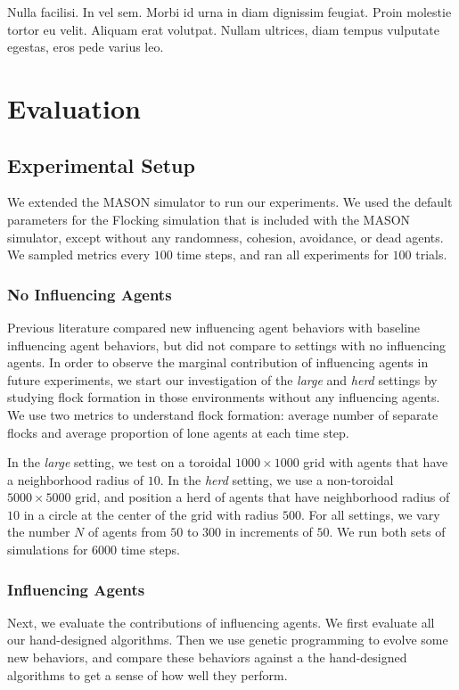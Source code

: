 \begin{savequote}[75mm]
Nulla facilisi. In vel sem. Morbi id urna in diam dignissim feugiat. Proin molestie tortor eu velit. Aliquam erat volutpat. Nullam ultrices, diam tempus vulputate egestas, eros pede varius leo.
\end{savequote}

\chapter{Evaluation}
\label{ch:evaluation}

\section{Experimental Setup}

We extended the MASON simulator to run our experiments\cite{luke05mason}.
We used the default parameters for the Flocking simulation that is included
with the MASON simulator, except without any randomness, cohesion, avoidance,
or dead agents.
We sampled metrics every $100$ time steps, and ran all experiments for $100$
trials.

\subsection{No Influencing Agents}
Previous literature compared new influencing agent behaviors with baseline
influencing agent behaviors, but did not compare to settings with no
influencing agents.
In order to observe the marginal contribution of influencing agents
in future experiments, we start our investigation of the \textit{large} and
\textit{herd} settings by studying flock formation in those environments
without any influencing agents.
We use two metrics to understand flock formation: average number of separate
flocks and average proportion of lone agents at each time step.

In the \textit{large} setting, we test on a toroidal $1000\times1000$ grid with
agents that have a neighborhood radius of $10$.
In the \textit{herd} setting, we use a non-toroidal $5000\times5000$ grid, and
position a herd of agents that have neighborhood radius of $10$ in a circle at
the center of the grid with radius $500$.
For all settings, we vary the number $N$ of agents from $50$ to $300$ in
increments of $50$.
We run both sets of simulations for $6000$ time steps.

\subsection{Influencing Agents}
Next, we evaluate the contributions of influencing agents.
We first evaluate all our hand-designed algorithms.
Then we use genetic programming to evolve some new behaviors, and compare these
behaviors against a the hand-designed algorithms to get a sense of how well
they perform.

